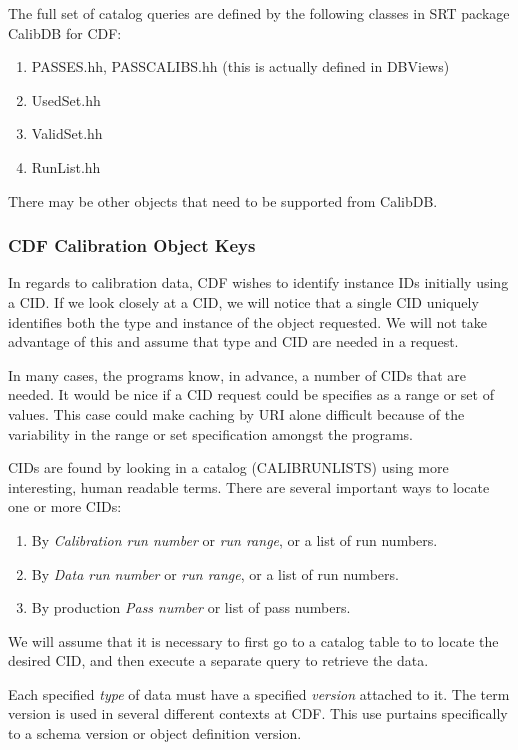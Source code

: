 The full set of catalog queries are defined by the following classes
in SRT package CalibDB for CDF:

\begin{enumerate}
\item PASSES.hh, PASSCALIBS.hh (this is actually defined in DBViews)
\item UsedSet.hh
\item ValidSet.hh
\item RunList.hh
\end{enumerate}

There may be other objects that need to be supported from CalibDB.

\subsubsection{CDF Calibration Object Keys}

In regards to calibration data, CDF wishes to identify instance IDs
initially using a CID.  If we look closely at a CID, we will notice
that a single CID uniquely identifies both the type and instance of
the object requested.  We will not take advantage of this and assume
that type and CID are needed in a request.

In many cases, the programs know, in advance, a number of CIDs
that are needed.  It would be nice if a CID request could be
specifies as a range or set of values.  This case could make 
caching by URI alone difficult because of the variability in the
range or set specification amongst the programs.

CIDs are found by looking in a catalog (CALIBRUNLISTS) using more
interesting, human readable terms.  There are
several important ways to locate one or more CIDs:

\begin{enumerate}
\item By \emph{Calibration run number} or \emph{run range},
or a list of run numbers.
\item By \emph{Data run number} or \emph{run range},
or a list of run numbers.
\item By production \emph{Pass number} or list of pass numbers.
\end{enumerate}

We will assume that it is necessary to first go to a catalog table to
to locate the desired CID, and then execute a separate query to retrieve
the data.

Each specified \emph{type} of data must have a specified \emph{version}
attached to it. The term version is used in several different contexts at
CDF.  This use purtains specifically to a schema version or object
definition version.

